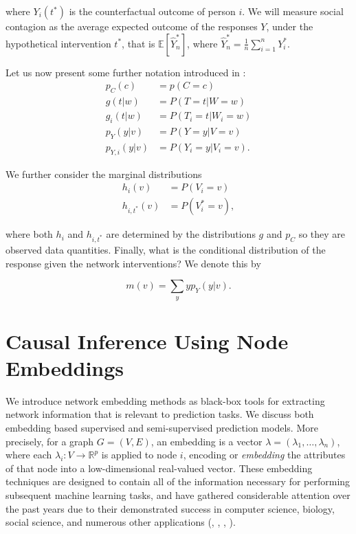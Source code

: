 \documentclass{article}
\begin{document}
\noindent where $Y_i(t^*)$ is the counterfactual outcome of person $i$. We will measure social contagion as the average expected outcome of the responses $Y$, under the hypothetical intervention $t^*$, that is $\mathbb{E}[\hat{Y}_n^*]$, where $\hat{Y}_n^* = \frac{1}{n} \sum_{i=1}^n Y_i^*$. 

Let us now present some further notation introduced in \cite{Ogburn:Sofrygin:Diaz:vanderLaan:2017}: 
\begin{align*}
p_C(c) &= p(C = c)\\
g(t|w) &= P(T = t| W =w)\\
g_i(t|w) &= P(T_i = t| W_i =w)\\
p_{Y}(y|v) &= P(Y = y|V  =  v) \\
p_{Y,  i}(y|v) &=  P(Y_i = y|V_i= v). 
\end{align*}

\noindent We further consider the marginal distributions
\begin{align*}
h_i(v) &= P(V_i = v) \\
h_{i, t^*}(v) &= P(V_i^* = v),
\end{align*}

\noindent where both  $h_i$ and $h_{i, t^*}$ are determined by the distributions $g$ and $p_C$ so they are observed data quantities. Finally, what is the conditional distribution of the response given the network interventions? We denote this by 

$$m(v) = \sum_y yp_Y(y|v). $$

\section{Causal Inference Using Node Embeddings}
\label{sec:embeddings}
We introduce network embedding methods as black-box tools for extracting network information that is relevant to prediction tasks. We discuss both embedding based supervised and semi-supervised prediction models. More precisely, for a graph $G = (V, E)$, an embedding is a vector $\lambda = (\lambda_1, \hdots, \lambda_n)$, where each $\lambda_i: V \to \mathbb{R}^p$ is applied to node $i$, encoding or \textit{embedding} the attributes of that node into a low-dimensional real-valued vector. These embedding techniques are designed to contain all of the information necessary for performing subsequent machine learning tasks, and have gathered considerable attention over the past years due to their demonstrated success in computer science, biology, social science, and numerous other applications (\cite{Hamilton:Ying:Leskovec:2018}, \cite{Chamberlain:Clough:Deisenroth:2017}, \cite{Perozzi:Al-Rfou:Skiena:2014}, \cite{Veitch:Austern:Zhou:Blei:Orbanz:2019}). 
\end{document}
